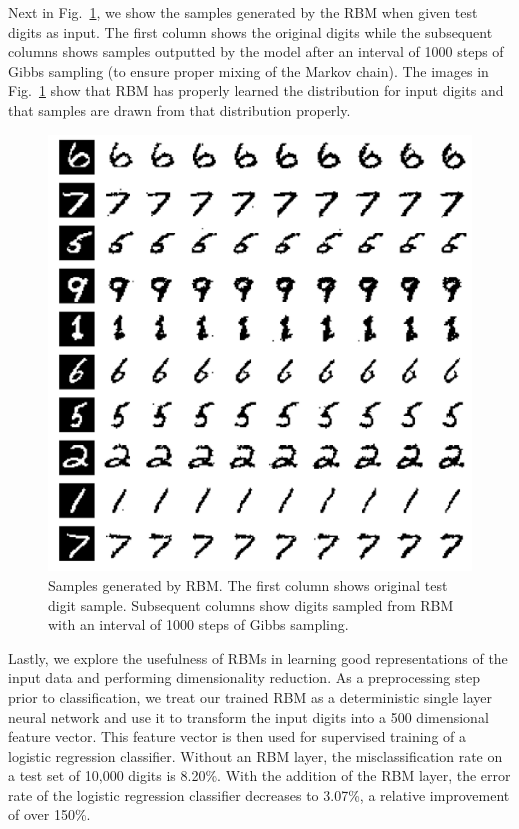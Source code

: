 \documentclass[journal]{IEEEtran}
\begin{document}
Next in Fig.~\ref{samples}, we show the samples generated by the RBM when given test digits as input. The first column shows the original digits while the subsequent columns shows samples outputted by the model after an interval of 1000 steps of Gibbs sampling (to ensure proper mixing of the Markov chain). The images in Fig.~\ref{samples} show that RBM has properly learned the distribution for input digits and that samples are drawn from that distribution properly. 

\begin{figure}[h]
  \centering
  \includegraphics[width=0.9\linewidth]{samples.png}
  \caption{Samples generated by RBM. The first column shows original test digit sample. Subsequent columns show digits sampled from RBM with an interval of 1000 steps of Gibbs sampling.}
  \label{samples}
\end{figure}

Lastly, we explore the usefulness of RBMs in learning good representations of the input data and performing dimensionality reduction. As a preprocessing step prior to classification, we treat our trained RBM as a deterministic single layer neural network and use it to transform the input digits into a 500 dimensional feature vector. This feature vector is then used for supervised training of a logistic regression classifier. Without an RBM layer, the misclassification rate on a test set of 10,000 digits is 8.20\%. With the addition of the RBM layer, the error rate of the logistic regression classifier decreases to 3.07\%, a relative improvement of over 150\%. 
\end{document}

